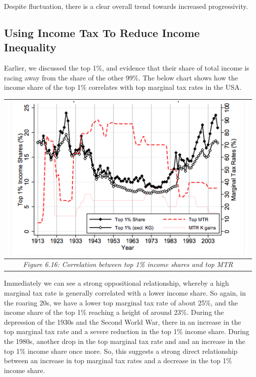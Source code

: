 \documentclass[]{tufte-handout}
\begin{document}
Despite fluctuation, there is a clear overall trend towards increased
progressivity.

\hypertarget{using-income-tax-to-reduce-income-inequality}{%
\subsection{Using Income Tax To Reduce Income
Inequality}\label{using-income-tax-to-reduce-income-inequality}}

Earlier, we discussed the top 1\%, and evidence that their share of
total income is racing away from the share of the other 99\%. The below
chart shows how the income share of the top 1\% correlates with top
marginal tax rates in the USA.

\begin{longtable}[]{@{}c@{}}
\toprule
\includegraphics{ChapterPictures/6-15-CorrelationIncomeSharesAndMTR.png}\tabularnewline
\midrule
\endhead
\emph{Figure 6.16: Correlation between top 1\% income shares and top
MTR}\tabularnewline
\bottomrule
\end{longtable}

Immediately we can see a strong oppositional relationship, whereby a
high marginal tax rate is generally correlated with a lower income
share. So again, in the roaring 20s, we have a lower top marginal tax
rate of about 25\%, and the income share of the top 1\% reaching a
height of around 23\%. During the depression of the 1930s and the Second
World War, there in an increase in the top marginal tax rate and a
severe reduction in the top 1\% income share. During the 1980s, another
drop in the top marginal tax rate and and an increase in the top 1\%
income share once more. So, this suggests a strong direct relationship
between an increase in top marginal tax rates and a decrease in the top
1\% income share.
\end{document}
